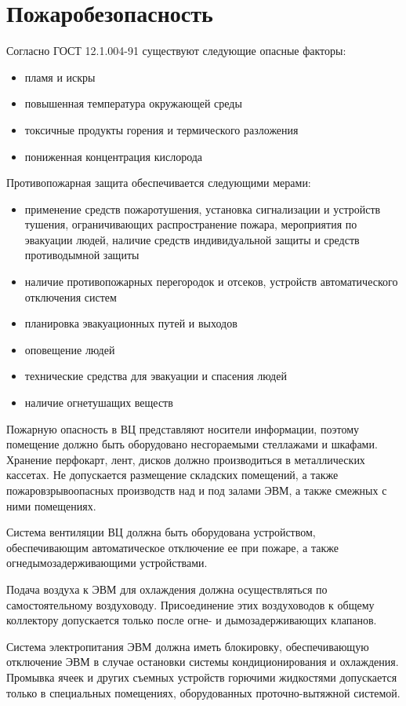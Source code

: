 \documentclass[12pt,a4paper]{report}
\begin{document}
\section{Пожаробезопасность}
Согласно ГОСТ 12.1.004-91 существуют следующие опасные факторы:
\begin{itemize}
\item пламя и искры
\item повышенная температура окружающей среды
\item токсичные продукты горения и термического разложения
\item пониженная концентрация кислорода
\end{itemize}
Противопожарная защита обеспечивается следующими мерами:
\begin{itemize}
\item применение средств пожаротушения, установка сигнализации и устройств тушения, ограничивающих распространение пожара, мероприятия по эвакуации людей, наличие средств индивидуальной защиты и средств противодымной защиты
\item наличие противопожарных перегородок и отсеков, устройств автоматического отключения систем
\item планировка эвакуационных путей и выходов
\item оповещение людей
\item технические средства для эвакуации и спасения людей
\item наличие огнетушащих веществ
\end{itemize}

Пожарную опасность в ВЦ представляют носители информации, поэтому помещение должно быть оборудовано несгораемыми стеллажами и шкафами. Хранение перфокарт, лент, дисков должно производиться в металлических кассетах. Не допускается размещение складских помещений, а также пожаровзрывоопасных производств над и под залами ЭВМ, а также смежных с ними помещениях.

Система вентиляции ВЦ должна быть оборудована устройством, обеспечивающим автоматическое отключение ее при пожаре, а также огнедымозадерживающими устройствами.

Подача воздуха к ЭВМ для охлаждения должна осуществляться по самостоятельному воздуховоду. Присоединение этих воздуховодов к общему коллектору допускается только после огне- и дымозадерживающих клапанов.

Система электропитания ЭВМ должна иметь блокировку, обеспечивающую отключение ЭВМ в случае остановки системы кондиционирования и охлаждения. Промывка ячеек и других съемных устройств горючими жидкостями допускается только в специальных помещениях, оборудованных проточно-вытяжной системой.
\end{document}
